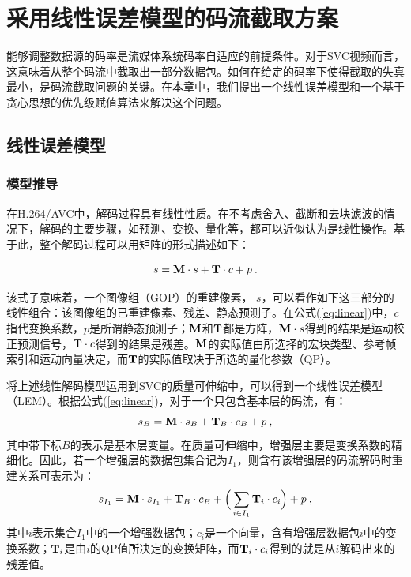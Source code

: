 \chapter{采用线性误差模型的码流截取方案}

能够调整数据源的码率是流媒体系统码率自适应的前提条件。对于SVC视频而言，这意味着从整个码流中截取出一部分数据包。如何在给定的码率下使得截取的失真最小，是码流截取问题的关键。在本章中，我们提出一个线性误差模型和一个基于贪心思想的优先级赋值算法来解决这个问题。

\section{线性误差模型}

\subsection{模型推导}

在H.264/AVC中，解码过程具有线性性质\supercite{Winken2008}。在不考虑舍入、截断和去块滤波的情况下，解码的主要步骤，如预测、变换、量化等，都可以近似认为是线性操作。基于此，整个解码过程可以用矩阵的形式描述如下：

\begin{equation}
\label{eq:linear}
s = {\rm\bf M} \cdot s + {\rm\bf T} \cdot c + p \: .
\end{equation}

该式子意味着，一个图像组（GOP）的重建像素， $s$，可以看作如下这三部分的线性组合：该图像组的已重建像素、残差、静态预测子。在公式(\ref{eq:linear})中，$c$指代变换系数，$p$是所谓静态预测子；$\rm\bf M$和$\rm\bf T$都是方阵，${\rm\bf M} \cdot s$得到的结果是运动校正预测信号，${\rm\bf T} \cdot c$得到的结果是残差。$\rm\bf M$的实际值由所选择的宏块类型、参考帧索引和运动向量决定，而$\rm\bf T$的实际值取决于所选的量化参数（QP）。

将上述线性解码模型运用到SVC的质量可伸缩中，可以得到一个线性误差模型（LEM）。根据公式(\ref{eq:linear})，对于一个只包含基本层的码流，有：
\begin{equation}
\label{eq:base0}
s_{B} = {\rm\bf M} \cdot s_{B} + {\rm\bf T}_{B} \cdot c_{B} + p \: ,
\end{equation}
其中带下标$B$的表示是基本层变量。在质量可伸缩中，增强层主要是变换系数的精细化。因此，若一个增强层的数据包集合记为$I_1$，则含有该增强层的码流解码时重建关系可表示为：
\begin{equation}
\label{eq:subset1}
s_{I_1} = {\rm\bf M} \cdot s_{I_1} + {\rm\bf T}_{B} \cdot c_{B} + \Big( \sum_{i \in I_1}{\rm\bf T}_i \cdot c_i \Big) + p \: ,
\end{equation}
其中$i$表示集合$I_1$中的一个增强数据包；$c_i$是一个向量，含有增强层数据包$i$中的变换系数；${\rm\bf T}_i$是由$i$的QP值所决定的变换矩阵，而${\rm\bf T}_i \cdot c_i$得到的就是从$i$解码出来的残差值。

